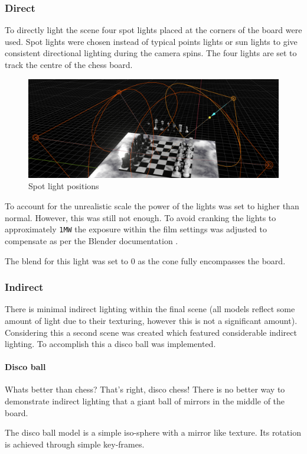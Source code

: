 \documentclass[11pt]{article}
\begin{document}
\subsubsection{Direct}
\label{sec:org254eacb}
To directly light the scene four spot lights placed at the corners of the board
were used. Spot lights were chosen instead of typical points lights or sun
lights to give consistent directional lighting during the camera spins. The four
lights are set to track the centre of the chess board.
\begin{figure}[htbp]
\centering
\includegraphics[width=\textwidth]{Images/lighting.png}
\caption{Spot light positions}
\end{figure}
To account for the unrealistic scale the power of the lights was set to higher
than normal. However, this was still not enough. To avoid cranking the lights
to approximately \texttt{1MW} the exposure within the film settings was adjusted to
compensate as per the Blender documentation \cite{light-power-docs}.

The blend for this light was set to 0 as the cone fully encompasses the board.
\subsubsection{Indirect}
\label{sec:orgac5b862}
There is minimal indirect lighting within the final scene (all models
reflect some amount of light due to their texturing, however this is not a
significant amount). Considering this a second scene was created which featured
considerable indirect lighting. To accomplish this a disco ball was implemented.
\paragraph{Disco ball}
\label{sec:orge3aaeaa}
Whats better than chess? That's right, disco chess! There is no better way to
demonstrate indirect lighting that a giant ball of mirrors in the middle of the board.

The disco ball model is a simple iso-sphere with a mirror like texture. Its
rotation is achieved through simple key-frames.
\end{document}

